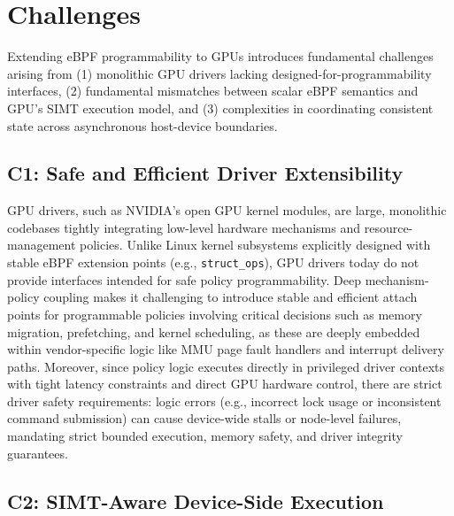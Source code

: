 \section{Challenges}
\label{sec:challenges}

Extending eBPF programmability to GPUs introduces fundamental challenges arising from (1) monolithic GPU drivers lacking designed-for-programmability interfaces, (2) fundamental mismatches between scalar eBPF semantics and GPU's SIMT execution model, and (3) complexities in coordinating consistent state across asynchronous host-device boundaries.

\subsection{C1: Safe and Efficient Driver Extensibility}

GPU drivers, such as NVIDIA's open GPU kernel modules, are large, monolithic codebases tightly integrating low-level hardware mechanisms and resource-management policies. Unlike Linux kernel subsystems explicitly designed with stable eBPF extension points (e.g., \texttt{struct\_ops}), GPU drivers today do not provide interfaces intended for safe policy programmability. Deep mechanism-policy coupling makes it challenging to introduce stable and efficient attach points for programmable policies involving critical decisions such as memory migration, prefetching, and kernel scheduling, as these are deeply embedded within vendor-specific logic like MMU page fault handlers and interrupt delivery paths. Moreover, since policy logic executes directly in privileged driver contexts with tight latency constraints and direct GPU hardware control, there are strict driver safety requirements: logic errors (e.g., incorrect lock usage or inconsistent command submission) can cause device-wide stalls or node-level failures, mandating strict bounded execution, memory safety, and driver integrity guarantees.

\subsection{C2: SIMT-Aware Device-Side Execution}

